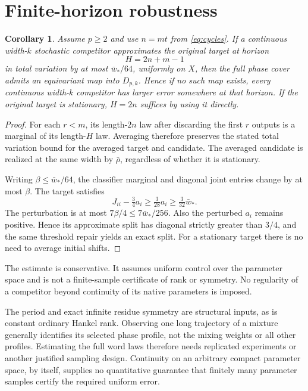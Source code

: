 \documentclass[11pt]{article}
\newtheorem{corollary}[theorem]{Corollary}
\theoremstyle{remark}\newtheorem{remark}[theorem]{Remark}
\begin{document}
\section{Finite-horizon robustness}
\begin{corollary}\label{cor:robust}
Assume $p\geq2$ and use $n=mt$ from \eqref{eq:cycles}. If a continuous width-$k$ stochastic competitor approximates the original target at horizon
\[
H=2n+m-1
\]
in total variation by at most $\bar w_*/64$, uniformly on $X$, then the full phase cover admits an equivariant map into $D_{p,k}$. Hence if no such map exists, every continuous width-$k$ competitor has larger error somewhere at that horizon. If the original target is stationary, $H=2n$ suffices by using it directly.
\end{corollary}
\begin{proof}
For each $r<m$, its length-$2n$ law after discarding the first $r$ outputs is a marginal of its length-$H$ law. Averaging therefore preserves the stated total variation bound for the averaged target and candidate. The averaged candidate is realized at the same width by $\bar\rho$, regardless of whether it is stationary.

Writing $\beta\leq\bar w_*/64$, the classifier marginal and diagonal joint entries change by at most $\beta$. The target satisfies
\[
J_{ii}-\tfrac34a_i\geq\tfrac3{28}a_i\geq\tfrac3{32}\bar w_*.
\]
The perturbation is at most $7\beta/4\leq7\bar w_*/256$. Also the perturbed $a_i$ remains positive. Hence its approximate split has diagonal strictly greater than $3/4$, and the same threshold repair yields an exact split. For a stationary target there is no need to average initial shifts.
\end{proof}
The estimate is conservative. It assumes uniform control over the parameter space and is not a finite-sample certificate of rank or symmetry. No regularity of a competitor beyond continuity of its native parameters is imposed.

The period and exact infinite residue symmetry are structural inputs, as is constant ordinary Hankel rank. Observing one long trajectory of a mixture generally identifies its selected phase profile, not the mixing weights or all other profiles. Estimating the full word laws therefore needs replicated experiments or another justified sampling design. Continuity on an arbitrary compact parameter space, by itself, supplies no quantitative guarantee that finitely many parameter samples certify the required uniform error.
\end{document}
